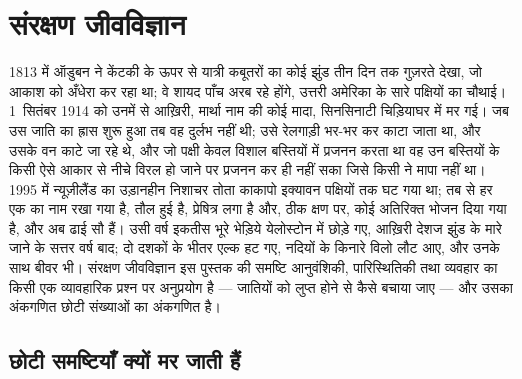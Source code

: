 \chapter{संरक्षण जीवविज्ञान}\label{ch:b3:conservation-biology}

1813 में ऑडुबन ने केंटकी के ऊपर से यात्री कबूतरों का कोई झुंड तीन दिन
तक गुज़रते देखा, जो आकाश को अँधेरा कर रहा था; वे शायद पाँच अरब रहे
होंगे, उत्तरी अमेरिका के सारे पक्षियों का चौथाई। 1~सितंबर 1914 को उनमें
से आख़िरी, मार्था नाम की कोई मादा, सिनसिनाटी चिड़ियाघर में मर गई। जब उस
जाति का ह्रास शुरू हुआ तब वह दुर्लभ नहीं थी; उसे रेलगाड़ी भर-भर कर काटा
जाता था, और उसके वन काटे जा रहे थे, और जो पक्षी केवल विशाल बस्तियों में
प्रजनन करता था वह उन बस्तियों के किसी ऐसे आकार से नीचे विरल हो जाने पर
प्रजनन कर ही नहीं सका जिसे किसी ने मापा नहीं था। 1995 में न्यूज़ीलैंड का
उड़ानहीन निशाचर तोता काकापो इक्यावन पक्षियों तक घट गया था; तब से हर एक
का नाम रखा गया है, तौल हुई है, प्रेषित्र लगा है और, ठीक क्षण पर, कोई
अतिरिक्त भोजन दिया गया है, और अब ढाई सौ हैं। उसी वर्ष इकतीस भूरे भेड़िये
येलोस्टोन में छोड़े गए, आख़िरी देशज झुंड के मारे जाने के सत्तर वर्ष बाद;
दो दशकों के भीतर एल्क हट गए, नदियों के किनारे विलो लौट आए, और उनके साथ
बीवर भी। संरक्षण जीवविज्ञान इस पुस्तक की समष्टि आनुवंशिकी, पारिस्थितिकी
तथा व्यवहार का किसी एक व्यावहारिक प्रश्न पर अनुप्रयोग है --- जातियों को
लुप्त होने से कैसे बचाया जाए --- और उसका अंकगणित छोटी संख्याओं का
अंकगणित है।

\section{छोटी समष्टियाँ क्यों मर जाती हैं}

